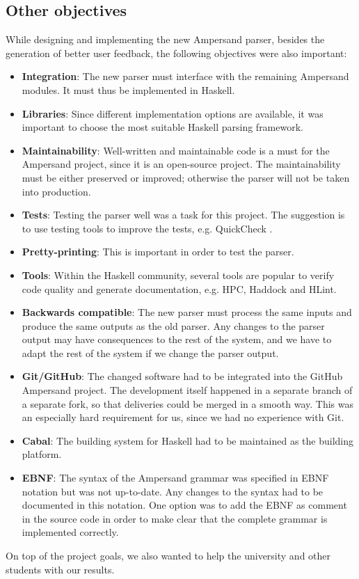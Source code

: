 
\subsection{Other objectives}
While designing and implementing the new Ampersand parser, besides the generation of better user feedback, the following objectives were also important:
\begin{itemize}
  \item \textbf{Integration}: The new parser must interface with the remaining Ampersand modules.
    It must thus be implemented in Haskell.
  \item \textbf{Libraries}: Since different implementation options are available, it was important to choose the most suitable Haskell parsing framework.
  \item \textbf{Maintainability}: Well-written and maintainable code is a must for the Ampersand project, since it is an open-source project.
    The maintainability must be either preserved or improved; otherwise the parser will not be taken into production.
  \item \textbf{Tests}: Testing the parser well was a task for this project.
    The suggestion is to use testing tools to improve the tests, e.g. QuickCheck .
  \item \textbf{Pretty-printing}: This is important in order to test the parser.
%
%
%
  \item \textbf{Tools}: Within the Haskell community, several tools are popular to verify code quality and generate documentation, e.g. HPC, Haddock and HLint.
  \item \textbf{Backwards compatible}: The new parser must process the same inputs and produce the same outputs as the old parser.
    Any changes to the parser output may have consequences to the rest of the system, and we have to adapt the rest of the system if we change the parser output.
  \item \textbf{Git/GitHub}: The changed software had to be integrated into the GitHub Ampersand project.
    The development itself happened in a separate branch of a separate fork, so that deliveries could be merged in a smooth way.
    This was an especially hard requirement for us, since we had no experience with Git.
  \item \textbf{Cabal}: The building system for Haskell had to be maintained as the building platform.
  \item \textbf{EBNF}: The syntax of the Ampersand grammar was specified in EBNF notation but was not up-to-date.
    Any changes to the syntax had to be documented in this notation.
    One option was to add the EBNF as comment in the source code in order to make clear that the complete grammar is implemented correctly.
\end{itemize}

On top of the project goals, we also wanted to help the university and other students with our results.
